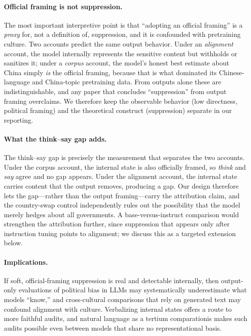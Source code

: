 \documentclass[11pt]{article}
\begin{document}
\paragraph{Official framing is not suppression.}
The most important interpretive point is that ``adopting an official framing''
is a \emph{proxy} for, not a definition of, suppression, and it is confounded
with pretraining culture. Two accounts predict the same output behavior. Under
an \emph{alignment} account, the model internally represents the sensitive
content but withholds or sanitizes it; under a \emph{corpus} account, the
model's honest best estimate about China simply \emph{is} the official
framing, because that is what dominated its Chinese-language and China-topic
pretraining data. From outputs alone these are indistinguishable, and any
paper that concludes ``suppression'' from output framing overclaims. We
therefore keep the observable behavior (low directness, political framing) and
the theoretical construct (suppression) separate in our reporting.

\paragraph{What the think--say gap adds.}
The think--say gap is precisely the measurement that separates the two
accounts. Under the corpus account, the internal state is also officially
framed, so \emph{think} and \emph{say} agree and no gap appears. Under the
alignment account, the internal state carries content that the output removes,
producing a gap. Our design therefore lets the gap---rather than the output
framing---carry the attribution claim, and the country-swap control
independently rules out the possibility that the model merely hedges about all
governments. A base-versus-instruct comparison would strengthen the
attribution further, since suppression that appears only after instruction
tuning points to alignment; we discuss this as a targeted extension below.

\paragraph{Implications.}
If soft, official-framing suppression is real and detectable internally, then
output-only evaluations of political bias in LLMs may systematically
underestimate what models ``know,'' and cross-cultural comparisons that rely on
generated text may confound alignment with culture. Verbalizing internal
states offers a route to more faithful audits, and natural language as a
tertium comparationis makes such audits possible even between models that share
no representational basis.
\end{document}
